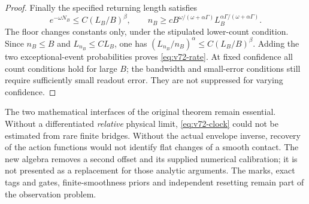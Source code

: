\begin{proof}
Finally the specified returning length satisfies
\[
 e^{-\omega N_B}\le C(L_B/B)^\beta,\qquad
 n_B\ge cB^{\omega/(\omega+\alpha\Gamma)}
             L_B^{\alpha\Gamma/(\omega+\alpha\Gamma)}.
\]
The floor changes constants only, under the stipulated lower-count
condition.  Since $n_B\le B$ and $L_{n_B}\le CL_B$, one has
$(L_{n_B}/n_B)^\alpha\le C(L_B/B)^\beta$.
Adding the two exceptional-event probabilities proves \eqref{eq:v72-rate}.
At fixed confidence all count conditions hold for large $B$; the
bandwidth and small-error conditions still require sufficiently small
readout error.  They are not suppressed for varying confidence.
\end{proof}

The two mathematical interfaces of the original theorem remain essential.
Without a differentiated \emph{relative} physical limit,
\eqref{eq:v72-clock} could not be estimated from rare finite bridges.
Without the actual envelope inverse, recovery of the action functions
would not identify flat changes of a smooth contact.  The new algebra
removes a second offset and its supplied numerical calibration; it is
not presented as a replacement for those analytic arguments.  The marks,
exact tags and gates, finite-smoothness priors and independent resetting
remain part of the observation problem.
